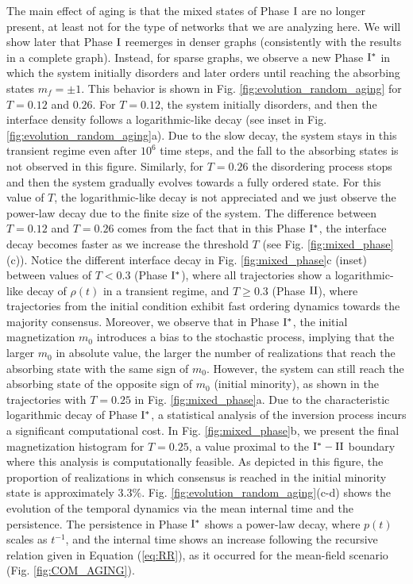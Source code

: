 The main effect of aging is that the mixed states of Phase ${\rm I}$ are no longer present, at least not for the type of networks that we are analyzing here. We will show later that Phase ${\rm I}$ reemerges in denser graphs (consistently with the results in a complete graph). Instead, for sparse graphs, we observe a new Phase ${\rm I}^{*}$ in which the system initially disorders and later orders until reaching the absorbing states $m_f = \pm 1$. This behavior is shown in Fig. \ref{fig:evolution_random_aging} for $T = 0.12$ and $0.26$. For $T = 0.12$, the system initially disorders, and then the interface density follows a logarithmic-like decay (see inset in Fig. \ref{fig:evolution_random_aging}a). Due to the slow decay, the system stays in this transient regime even after $10^{6}$ time steps, and the fall to the absorbing states is not observed in this figure. Similarly, for $T = 0.26$ the disordering process stops and then the system gradually evolves towards a fully ordered state. For this value of $T$, the logarithmic-like decay is not appreciated and we just observe the power-law decay due to the finite size of the system. The difference between $T = 0.12$ and $T = 0.26$ comes from the fact that in this Phase ${\rm I}^{*}$, the interface decay becomes faster as we increase the threshold $T$ (see Fig. \ref{fig:mixed_phase}(c)). Notice the different interface decay in Fig. \ref{fig:mixed_phase}c (inset) between values of $T < 0.3$ (Phase ${\rm I}^{*}$), where all trajectories show a logarithmic-like decay of $\rho(t)$ in a transient regime, and $T \geq 0.3$ (Phase ${\rm II}$), where trajectories from the initial condition exhibit fast ordering dynamics towards the majority consensus. Moreover, we observe that in Phase ${\rm I}^{*}$, the initial magnetization $m_0$ introduces a bias to the stochastic process, implying that the larger $m_0$ in absolute value, the larger the number of realizations that reach the absorbing state with the same sign of $m_0$. However, the system can still reach the absorbing state of the opposite sign of $m_0$ (initial minority), as shown in the trajectories with $T = 0.25$ in Fig. \ref{fig:mixed_phase}a. Due to the characteristic logarithmic decay of Phase ${\rm I}^{*}$, a statistical analysis of the inversion process incurs a significant computational cost. In Fig. \ref{fig:mixed_phase}b, we present the final magnetization histogram for $T=0.25$, a value proximal to the ${\rm I}^{*} - {\rm II}$ boundary where this analysis is computationally feasible. As depicted in this figure, the proportion of realizations in which consensus is reached in the initial minority state is approximately $3.3\%$. Fig. \ref{fig:evolution_random_aging}(c-d) shows the evolution of the temporal dynamics via the mean internal time and the persistence. The persistence in Phase ${\rm I}^{*}$ shows a power-law decay, where $p(t)$ scales as $t^{-1}$, and the internal time shows an increase following the recursive relation given in Equation (\ref{eq:RR}), as it occurred for the mean-field scenario (Fig. \ref{fig:COM_AGING}).


